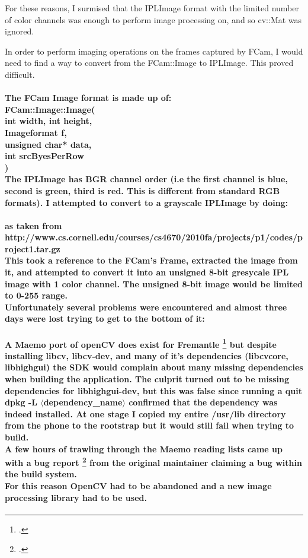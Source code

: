 For these reasons, I surmised that the IPLImage format with the limited number of color channels was enough to perform image processing on, and so cv::Mat was ignored.

In order to perform imaging operations on the frames captured by FCam, I would need to find a way to convert from the FCam::Image to IPLImage. This proved difficult.

\paragraph{The FCam Image format is made up of:\\
\tab FCam::Image::Image(\\
\tab\tab int width,  int height,\\
\tab\tab Imageformat f,\\
\tab\tab unsigned char* data,\\
\tab\tab int srcByesPerRow\\
)\\
The IPLImage has BGR channel order (i.e the first channel is blue, second is green, third is red. This is different from standard RGB formats). I attempted to convert to a grayscale IPLImage by doing:}
\begin{frame}[fragile]

\end{frame}
\paragraph{as taken from http://www.cs.cornell.edu/courses/cs4670/2010fa/projects/p1/codes/project1.tar.gz\\
This took a reference to the FCam's Frame, extracted the image from it, and attempted to convert it into an unsigned 8-bit gresycale IPL image with 1 color channel. The unsigned 8-bit image would be limited to 0-255 range.\\
Unfortunately several problems were encountered and almost three days were lost trying to get to the bottom of it:}
\paragraph{
A Maemo port of openCV does exist for Fremantle \footcite{libcv} but despite installing libcv, libcv-dev, and many of it's dependencies (libcvcore, libhighgui) the SDK would complain about many missing dependencies when building the application. The culprit turned out to be missing dependencies for libhighgui-dev, but this was false since running a quit dpkg -L \(\langle\)dependency\_name\(\rangle\) confirmed that the dependency was indeed installed. At one stage I copied my entire /usr/lib directory from the phone to the rootstrap but it would still fail when trying to build.\\
A few hours of trawling through the Maemo reading lists came up with a bug report \footcite{highgui-dev} from the original maintainer claiming a bug within the build system.\\
For this reason OpenCV had to be abandoned and a new image processing library had to be used.
}
